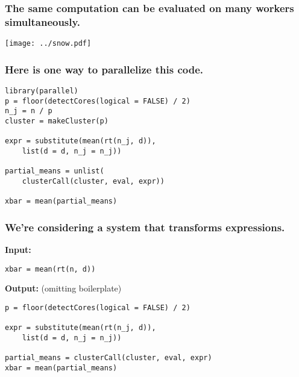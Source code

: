 \documentclass{beamer}
\begin{document}
\begin{frame}

    \frametitle{The same computation can be evaluated on many workers
    simultaneously.}

\centerline{\texttt{[image: ../snow.pdf]}}

\end{frame}
\begin{frame}[fragile]

    \frametitle{Here is one way to parallelize this code.}

\begin{verbatim}
library(parallel)
p = floor(detectCores(logical = FALSE) / 2)
n_j = n / p
cluster = makeCluster(p)

expr = substitute(mean(rt(n_j, d)),
	list(d = d, n_j = n_j))

partial_means = unlist(
    clusterCall(cluster, eval, expr))

xbar = mean(partial_means)
\end{verbatim}

\end{frame}
\begin{frame}[fragile]

    \frametitle{We're considering a system that transforms expressions.}

\hfill

    \textbf{Input:}

\begin{verbatim}
xbar = mean(rt(n, d))
\end{verbatim}

\hfill

    \textbf{Output:} (omitting boilerplate)

\begin{verbatim}
p = floor(detectCores(logical = FALSE) / 2)

expr = substitute(mean(rt(n_j, d)),
    list(d = d, n_j = n_j))

partial_means = clusterCall(cluster, eval, expr)
xbar = mean(partial_means)
\end{verbatim}

\hfill

\end{frame}
\end{document}
